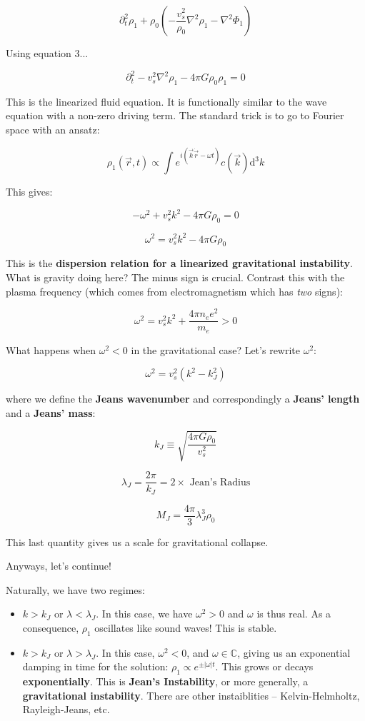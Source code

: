 \documentclass{article}
\newcommand{\be}{\begin{equation}}
\newcommand{\ee}{\end{equation}}
\begin{document}
\be
\partial_t^2 \rho_1 + \rho_0 \left(-\frac{v_s^2}{\rho_0} \nabla^2 \rho_1 - \nabla^2 \Phi_1\right)
\ee

Using equation 3...

\be
\boxed{\partial^2_t  - v_s^2 \nabla^2 \rho_1 - 4\pi G \rho_0\rho_1 = 0}
\ee

This is the linearized fluid equation. It is functionally similar to the wave equation with a non-zero driving term. The standard trick is to go to Fourier space with an ansatz:

\be
\rho_1 (\vec{r},t) \propto \int e^{i(\vec{k}\dot\vec{r} - \omega t)} c\left(
\vec{k}\right) \mathrm{d}^3 k
\ee

This gives:

\be
-\omega^2 + v_s^2 k^2 - 4\pi G \rho_0 = 0 
\ee

\be
\boxed{\omega^2 = v_s^2 k^2 - 4\pi G \rho_0 }
\ee

This is the \textbf{dispersion relation for a linearized gravitational instability}. What is gravity doing here? The minus sign is crucial. Contrast this with the plasma frequency (which comes from electromagnetism which has \textit{two} signs):

\be
\omega^2 = v^2_s k^2 + \frac{4\pi n_e e^2}{m_e} > 0
\ee

What happens when $\omega^2 < 0$ in the gravitational case? Let's rewrite $\omega^2$:

\be
\omega^2 = v_s^2 \left(k^2 - k_J^2\right)
\ee

where we define the \textbf{Jeans wavenumber} and correspondingly a \textbf{Jeans' length} and a \textbf{Jeans' mass}:

\be
k_J \equiv \sqrt{\frac{4\pi G \rho_0}{v_s^2}}
\ee

\be
\lambda_J = \frac{2\pi}{k_J} = 2 \times \text{ Jean's Radius}
\ee

\be
M_J = \frac{4\pi}{3} \lambda_J^3 \rho_0
\ee

This last quantity gives us a scale for gravitational collapse.

Anyways, let's continue!

Naturally, we have two regimes:

\begin{itemize}
    \item $k > k_J$ or $\lambda < \lambda_J$. In this case, we have $\omega^2 > 0$ and $\omega$ is thus real. As a consequence, $\rho_1$ oscillates like sound waves! This is stable.
    \item $k > k_J$ or $\lambda > \lambda_J$. In this case, $\omega^2 < 0$, and $\omega \in \mathbb{C}$, giving us an exponential damping in time for the solution: $\rho_1 \propto e^{\pm |\omega|t}$. This grows or decays \textbf{exponentially}. This is \textbf{Jean's Instability}, or more generally, a \textbf{gravitational instability}. There are other instaiblities -- Kelvin-Helmholtz, Rayleigh-Jeans, etc. 
\end{itemize}
\end{document}

